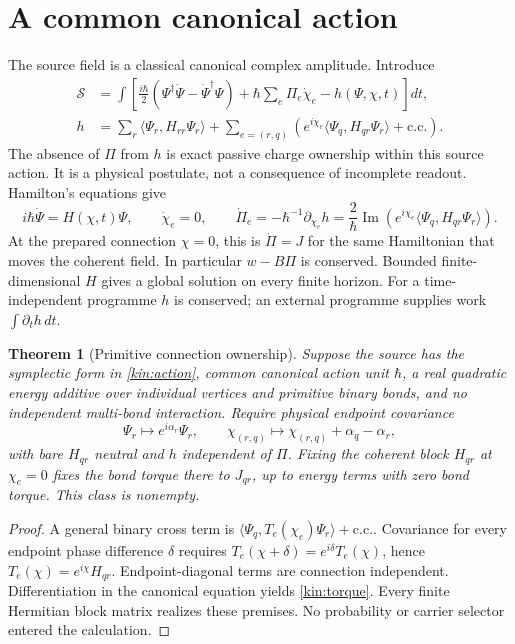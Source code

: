 \documentclass[11pt,oneside,openany]{book}
\newtheorem{theorem}{Theorem}[chapter]
\theoremstyle{definition}
\theoremstyle{remark}\newtheorem{remark}[theorem]{Remark}
\begin{document}
\section{A common canonical action}
The source field is a classical canonical complex amplitude. Introduce
\begin{align}
 \mathcal S&=\int\left[\frac{i\hbar}{2}
 (\Psi^\dagger\dot\Psi-\dot\Psi^\dagger\Psi)
 +\hbar\sum_e\Pi_e\dot\chi_e-h(\Psi,\chi,t)\right]dt,
 \label{kin:action}\\
 h&=\sum_r\langle\Psi_r,H_{rr}\Psi_r\rangle+
 \sum_{e=(r,q)}\left(e^{i\chi_e}
 \langle\Psi_q,H_{qr}\Psi_r\rangle+\mathrm{c.c.}\right).
 \label{kin:energy}
\end{align}
The absence of $\Pi$ from $h$ is exact passive charge ownership within this
source action. It is a physical postulate, not a consequence of incomplete
readout. Hamilton's equations give
\begin{equation}
 i\hbar\dot\Psi=H(\chi,t)\Psi,\qquad \dot\chi_e=0,\qquad
 \dot\Pi_e=-\hbar^{-1}\partial_{\chi_e}h
 =\frac2\hbar\operatorname{Im}
 \left(e^{i\chi_e}\langle\Psi_q,H_{qr}\Psi_r\rangle\right).
 \label{kin:torque}
\end{equation}
At the prepared connection $\chi=0$, this is $\dot\Pi=J$ for the same
Hamiltonian that moves the coherent field. In particular $w-B\Pi$ is
conserved. Bounded finite-dimensional $H$ gives a global solution on every
finite horizon. For a time-independent programme $h$ is conserved; an
external programme supplies work $\int\partial_t h\,dt$.

\begin{theorem}[Primitive connection ownership]\label{kin:ownership}
Suppose the source has the symplectic form in \eqref{kin:action}, common
canonical action unit $\hbar$, a real quadratic energy additive over
individual vertices and primitive binary bonds, and no independent
multi-bond interaction. Require physical endpoint covariance
\[
 \Psi_r\mapsto e^{i\alpha_r}\Psi_r,\qquad
 \chi_{(r,q)}\mapsto\chi_{(r,q)}+\alpha_q-\alpha_r,
\]
with bare $H_{qr}$ neutral and $h$ independent of $\Pi$. Fixing the coherent
block $H_{qr}$ at $\chi_e=0$ fixes the bond torque there to $J_{qr}$, up to
energy terms with zero bond torque. This class is nonempty.
\end{theorem}
\begin{proof}
A general binary cross term is
$\langle\Psi_q,T_e(\chi_e)\Psi_r\rangle+\mathrm{c.c.}$.
Covariance for every endpoint phase difference $\delta$ requires
$T_e(\chi+\delta)=e^{i\delta}T_e(\chi)$, hence
$T_e(\chi)=e^{i\chi}H_{qr}$. Endpoint-diagonal terms are connection
independent. Differentiation in the canonical equation yields
\eqref{kin:torque}. Every finite Hermitian block matrix realizes these
premises. No probability or carrier selector entered the calculation.
\end{proof}
\end{document}
